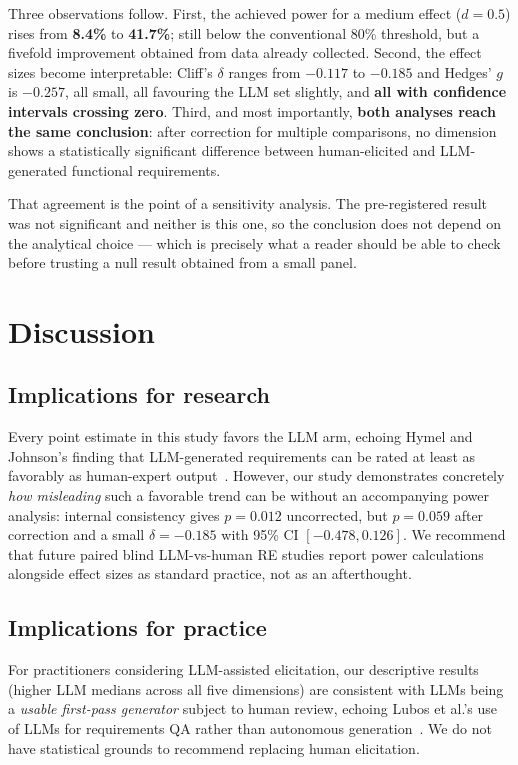 \documentclass{llncs}
\begin{document}
Three observations follow. First, the achieved power for a medium effect ($d=0.5$) rises from
\textbf{8.4\%} to \textbf{41.7\%}; still below the conventional 80\% threshold, but a fivefold
improvement obtained from data already collected. Second, the effect sizes become
interpretable: Cliff's $\delta$ ranges from $-0.117$ to $-0.185$ and Hedges' $g$ is $-0.257$,
all small, all favouring the LLM set slightly, and \textbf{all with confidence intervals
crossing zero}. Third, and most importantly, \textbf{both analyses reach the same conclusion}:
after correction for multiple comparisons, no dimension shows a statistically significant
difference between human-elicited and LLM-generated functional requirements.

That agreement is the point of a sensitivity analysis. The pre-registered result was not
significant and neither is this one, so the conclusion does not depend on the analytical choice
--- which is precisely what a reader should be able to check before trusting a null result
obtained from a small panel.

\section{Discussion}

\subsection{Implications for research}
Every point estimate in this study favors the LLM arm, echoing Hymel and Johnson's
finding that LLM-generated requirements can be rated at least as favorably as
human-expert output~\cite{hymel2025analysis}. However, our study demonstrates
concretely \emph{how misleading} such a favorable trend can be without an accompanying
power analysis: internal consistency gives $p=0.012$ uncorrected, but $p=0.059$ after
correction and a small $\delta=-0.185$ with 95\% CI $[-0.478, 0.126]$. We recommend that future paired blind
LLM-vs-human RE studies report power calculations alongside effect sizes as standard
practice, not as an afterthought.

\subsection{Implications for practice}
For practitioners considering LLM-assisted elicitation, our descriptive results (higher
LLM medians across all five dimensions) are consistent with LLMs being a
\emph{usable first-pass generator} subject to human review, echoing Lubos et al.'s use
of LLMs for requirements QA rather than autonomous generation~\cite{lubos2024leveraging}.
We do not have statistical grounds to recommend replacing human elicitation.
\end{document}
